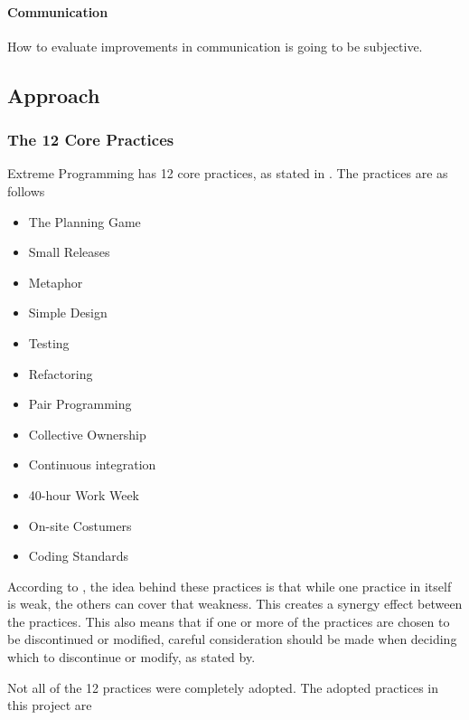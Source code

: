 \paragraph{Communication}
How to evaluate improvements in communication is going to be subjective.


\subsection{Approach}
\subsubsection{The 12 Core Practices}
Extreme Programming has 12 core practices, as stated in \citep{xp:explained}. The practices are as follows

\begin{itemize}
\item The Planning Game
\item Small Releases
\item Metaphor
\item Simple Design
\item Testing
\item Refactoring
\item Pair Programming
\item Collective Ownership
\item Continuous integration
\item 40-hour Work Week
\item On-site Costumers
\item Coding Standards
\end{itemize}

According to \citep[p. 53]{xp:explained}, the idea behind these practices is that while one practice in itself is weak, the others can cover that weakness. This creates a synergy effect between the practices. This also means that if one or more of the practices are chosen to be discontinued or modified, careful consideration should be made when deciding which to discontinue or modify, as stated by.

Not all of the 12 practices were completely adopted. The adopted practices in this project are\\

